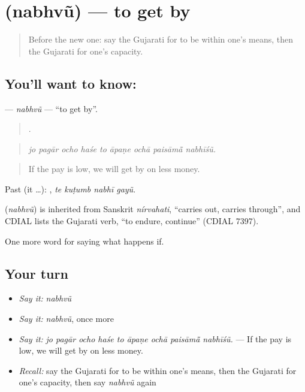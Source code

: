 \section[\texorpdfstring{\gu{નભવું} (nabhvũ)}{નભવું (nabhvũ)}]{ (nabhvũ) — to get by}

\label{lesson:GU-C532-nabhvu}



\begin{quote}
Before the new one: say the Gujarati for to be within one's means, then the Gujarati for one's capacity.
\end{quote}

\subsection*{You'll want to know: }
\textbf{} — \emph{nabhvũ} — \textquotedblleft{}to get by\textquotedblright{}.

\begin{quote}
        .
\end{quote}

\begin{quote}
\emph{jo pagār ocho haśe to āpaṇe ochā paisāmā̃ nabhīśũ.}
\end{quote}

\begin{quote}
If the pay is low, we will get by on less money.
\end{quote}

Past (it …):    , \emph{te kuṭumb nabhī gayũ}.

\begin{cousinweb}
\textbf{} (\emph{nabhvũ}) is inherited from Sanskrit \emph{nírvahati}, \textquotedblleft{}carries out, carries through\textquotedblright{}, and CDIAL lists the Gujarati verb, \textquotedblleft{}to endure, continue\textquotedblright{} (CDIAL 7397).
\end{cousinweb}

\begin{grammarlens}[title={What you've built}]
One more word for saying what happens if.
\end{grammarlens}

\subsection*{Your turn}
\begin{itemize}
\raggedright
  \item \emph{Say it:} \emph{nabhvũ}
  \item \emph{Say it:} \emph{nabhvũ}, once more
  \item \emph{Say it:} \emph{jo pagār ocho haśe to āpaṇe ochā paisāmā̃ nabhīśũ.} — If the pay is low, we will get by on less money.
  \item \emph{Recall:} say the Gujarati for to be within one's means, then the Gujarati for one's capacity, then say \emph{nabhvũ} again
\end{itemize}

